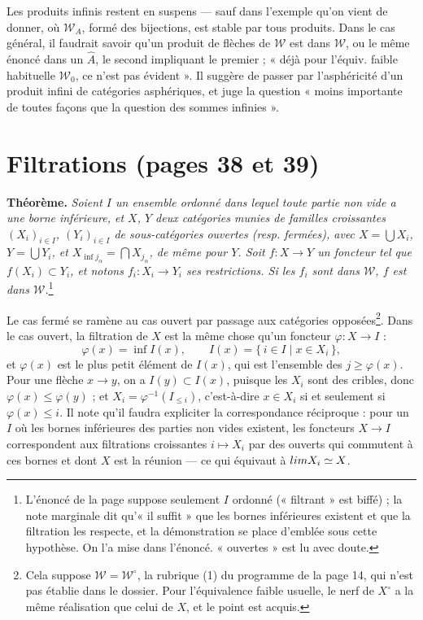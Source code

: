 \documentclass[11pt,a4paper]{article}
\begin{document}
Les produits infinis restent en suspens --- sauf dans l'exemple qu'on vient
de donner, où $\mathcal{W}_{A}$, formé des bijections, est stable par tous
produits. Dans le cas général, il faudrait savoir qu'un produit de
flèches de $\mathcal{W}$ est dans $\mathcal{W}$, ou le même énoncé dans un
$\widehat{A}$, le second impliquant le premier ; « déjà pour l'équiv. faible
habituelle $\mathcal{W}_{0}$, ce n'est pas évident ». Il suggère de passer
par l'asphéricité d'un produit infini de catégories asphériques, et juge la
question « moins importante de toutes façons que la question des sommes
infinies ».

\section*{Filtrations (pages 38 et 39)}

\textbf{Théorème.} \emph{Soient $I$ un ensemble ordonné dans lequel toute
partie non vide a une borne inférieure, et $X$, $Y$ deux catégories munies de
familles croissantes $(X_{i})_{i \in I}$, $(Y_{i})_{i \in I}$ de
sous-catégories ouvertes (resp. fermées), avec $X = \bigcup X_{i}$,
$Y = \bigcup Y_{i}$, et $X_{\inf j_{\alpha}} = \bigcap X_{j_{\alpha}}$, de même
pour $Y$. Soit $f : X \to Y$ un foncteur tel que $f(X_{i}) \subset Y_{i}$, et
notons $f_{i} : X_{i} \to Y_{i}$ ses restrictions. Si les $f_{i}$ sont dans
$\mathcal{W}$, $f$ est dans $\mathcal{W}$.}\footnote{L'énoncé de la page
suppose seulement $I$ ordonné (« filtrant » est biffé) ; la note marginale
dit qu'« il suffit » que les bornes inférieures existent et que la
filtration les respecte, et la démonstration se place d'emblée sous cette
hypothèse. On l'a mise dans l'énoncé. « ouvertes » est lu avec doute.}

Le cas fermé se ramène au cas ouvert par passage aux catégories
opposées\footnote{Cela suppose $\mathcal{W} = \mathcal{W}^{\circ}$, la
rubrique (1) du programme de la page 14, qui n'est pas établie dans le
dossier. Pour l'équivalence faible usuelle, le nerf de $X^{\circ}$ a la même
réalisation que celui de $X$, et le point est acquis.}. Dans le cas ouvert, la
filtration de $X$ est la même chose qu'un foncteur $\varphi : X \to I$ :
\[
\varphi(x) = \inf I(x), \qquad I(x) = \{\, i \in I \mid x \in X_{i} \,\},
\]
et $\varphi(x)$ est le plus petit élément de $I(x)$, qui est l'ensemble des
$j \geq \varphi(x)$. Pour une flèche $x \to y$, on a $I(y) \subset I(x)$,
puisque les $X_{i}$ sont des cribles, donc $\varphi(x) \leq \varphi(y)$ ; et
$X_{i} = \varphi^{-1}(I_{\leq i})$, c'est-à-dire $x \in X_{i}$ si et seulement
si $\varphi(x) \leq i$. Il note qu'il faudra expliciter la correspondance
réciproque : pour un $I$ où les bornes inférieures des parties non vides
existent, les foncteurs $X \to I$ correspondent aux filtrations croissantes
$i \mapsto X_{i}$ par des ouverts qui commutent à ces bornes et dont $X$ est
la réunion --- ce qui équivaut à $\varinjlim X_{i} \simeq X$.
\end{document}
